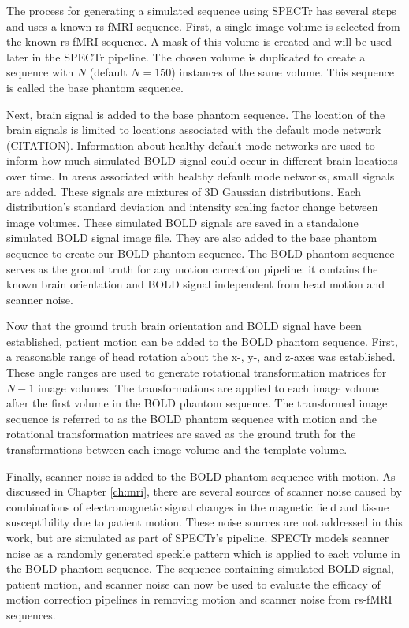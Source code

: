 The process for generating a simulated sequence using SPECTr has several steps and uses a known rs-fMRI sequence. First, a single image volume is selected from the known rs-fMRI sequence. A mask of this volume is created and will be used later in the SPECTr pipeline. The chosen volume is duplicated to create a sequence with $N$ (default $N=150$) instances of the same volume. This sequence is called the base phantom sequence. 

Next, brain signal is added to the base phantom sequence. The location of the brain signals is limited to locations associated with the default mode network (CITATION). Information about healthy default mode networks are used to inform how much simulated BOLD signal could occur in different brain locations over time.
In areas associated with healthy default mode networks, small signals are added. These signals are mixtures of 3D Gaussian distributions. Each distribution's standard deviation and intensity scaling factor change between image volumes. These simulated BOLD signals are saved in a standalone simulated BOLD signal image file. They are also added to the base phantom sequence to create our BOLD phantom sequence. The BOLD phantom sequence serves as the ground truth for any motion correction pipeline: it contains the known brain orientation and BOLD signal independent from head motion and scanner noise.

Now that the ground truth brain orientation and BOLD signal have been established, patient motion can be added to the BOLD phantom sequence. First, a reasonable range of head rotation about the x-, y-, and z-axes was established. These angle ranges are used to generate rotational transformation matrices for $N-1$ image volumes. The transformations are applied to each image volume after the first volume in the BOLD phantom sequence. The transformed image sequence is referred to as the BOLD phantom sequence with motion and the rotational transformation matrices are saved as the ground truth for the transformations between each image volume and the template volume. 

Finally, scanner noise is added to the BOLD phantom sequence with motion. As discussed in Chapter \ref{ch:mri}, there are several sources of scanner noise caused by combinations of electromagnetic signal changes in the magnetic field and tissue susceptibility due to patient motion. These noise sources are not addressed in this work, but are simulated as part of SPECTr's pipeline. SPECTr models scanner noise as a randomly generated speckle pattern which is applied to each volume in the BOLD phantom sequence. The sequence containing simulated BOLD signal, patient motion, and scanner noise can now be used to evaluate the efficacy of motion correction pipelines in removing motion and scanner noise from rs-fMRI sequences.

